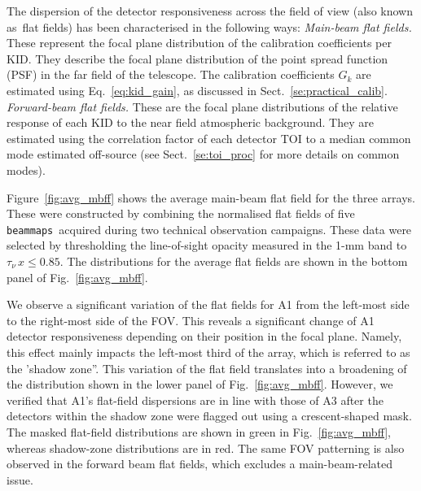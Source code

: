 \documentclass[traditionalabstract]{aa}
\newcommand{\bms}{{\tt beammaps}}
\newcommand{\taunu}{\tau_{\nu}}
\newcommand{\lp}[1]{#1}
\begin{document}
{The dispersion of the detector responsiveness across the field of view (also known as\ flat
fields) has been characterised in the following ways:
\noindent \emph{Main-beam flat fields.} These represent the focal plane
distribution of the calibration coefficients per KID. {\lp They describe the
focal plane distribution of the point spread function (PSF) in
the far field of the telescope.} The calibration coefficients $G_k$ are
estimated using Eq.~\ref{eq:kid_gain}, as discussed in
Sect.~\ref{se:practical_calib}.
\noindent \emph{Forward-beam flat fields.} These are the focal plane
distributions of the relative response of
each KID to the near field atmospheric background. They are estimated
using the correlation factor of each detector TOI 
to a median common mode estimated off-source (see Sect.~\ref{se:toi_proc} for
more details on common modes).

Figure~\ref{fig:avg_mbff} %
shows the average main-beam %
flat field for the three arrays. These were constructed by
combining the normalised flat fields of five \bms\ acquired during two
technical observation campaigns. These data were
selected by thresholding the line-of-sight opacity measured in the
1-mm band to $\taunu\,x \leq 0.85$. The distributions for the average flat
fields are shown in the bottom panel of Fig.~\ref{fig:avg_mbff}.%

We observe a significant variation of the flat fields for A1 from the left-most side
to the right-most side of the FOV. This reveals a significant change of A1
detector responsiveness depending on their position in the focal plane. Namely, this
effect mainly impacts the left-most third of the array, which is
referred to as the 'shadow zone''. This variation of the
flat field translates into a broadening of the distribution shown in
the lower panel of Fig.~\ref{fig:avg_mbff}.  However,
we verified that A1's flat-field dispersions are in line with those of A3 after the
detectors within the shadow zone were flagged out using a
crescent-shaped mask. The masked flat-field distributions are shown in
green in Fig.~\ref{fig:avg_mbff}, %
whereas shadow-zone distributions are in red. The same FOV patterning
is also observed in the forward beam flat fields, which excludes a
main-beam-related issue. 

}
\end{document}
